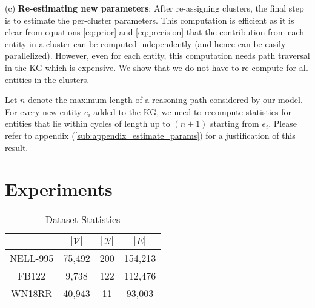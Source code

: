 \documentclass[11pt,a4paper]{article}
\begin{document}
(c) \textbf{Re-estimating new parameters}: After re-assigning clusters, the final step is to estimate the per-cluster parameters. This computation is efficient as it is clear from equations \ref{eq:prior} and \ref{eq:precision} that the contribution from each entity in a cluster can be computed independently (and hence can be easily parallelized). However, even for each entity, this computation needs path traversal in the KG which is expensive. We show that we do not have to re-compute for all entities in the clusters.

Let $n$ denote the maximum length of a reasoning path considered by our model. For every new entity $e_i$ added to the KG, we need to recompute statistics for entities that lie within cycles of length up to $(n+1)$ starting from $e_i$. 
Please refer to appendix (\ref{sub:appendix_estimate_params}) for a justification of this result. \section{Experiments}
\label{sec:experiments}
\begin{table}[]
    \centering
    \begin{tabular}{cccc}
    \toprule
        &  $| \mathcal{V} |$ & $| \mathcal{R} |$ & $|E|$ \\
        \midrule
         NELL-995 & 75,492 & 200 & 154,213  \\
         FB122 & 9,738 & 122 & 112,476 \\
         WN18RR & 40,943 & 11 & 93,003 \\
         \bottomrule
    \end{tabular}
    \caption{Dataset Statistics}
    \label{tab:dataset_stats}
\end{table}
\end{document}
